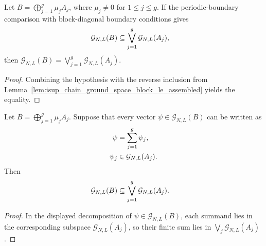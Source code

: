 \begin{lemma}
    \label{lem:block_diagonal_boundary_closing_equality}
    \leanok
    Let $B=\bigoplus_{j=1}^g\mu_jA_j$, where $\mu_j\ne0$ for
    $1\le j\le g$. If the periodic-boundary comparison with block-diagonal
    boundary conditions gives
    \begin{align}
        \mathcal G_{N,L}(B)
         & \subseteq
        \bigvee_{j=1}^g\mathcal G_{N,L}(A_j),
        \notag
    \end{align}
    then
    $\mathcal G_{N,L}(B) = \bigvee_{j=1}^g\mathcal G_{N,L}(A_j)$.
\end{lemma}

\begin{proof}
    \leanok
    Combining the hypothesis with the reverse inclusion from
    Lemma~\ref{lem:isup_chain_ground_space_block_le_assembled} yields the
    equality.
\end{proof}

\begin{lemma}
    \label{lem:block_diagonal_boundary_decomposition_inclusion}
    \leanok
    Let $B=\bigoplus_{j=1}^g\mu_jA_j$. Suppose that every vector
    $\psi\in\mathcal G_{N,L}(B)$ can be written as
    \begin{align}
        \psi   & = \sum_{j=1}^g\psi_j,
        \notag                              \\
        \psi_j & \in \mathcal G_{N,L}(A_j).
        \notag
    \end{align}
    Then
    \begin{align}
        \mathcal G_{N,L}(B)
         & \subseteq
        \bigvee_{j=1}^g\mathcal G_{N,L}(A_j).
        \notag
    \end{align}
\end{lemma}

\begin{proof}
    \leanok
    In the displayed decomposition of $\psi\in\mathcal G_{N,L}(B)$, each
    summand lies in the corresponding subspace
    $\mathcal G_{N,L}(A_j)$, so their finite sum lies in
    $\bigvee_j\mathcal G_{N,L}(A_j)$.
\end{proof}

